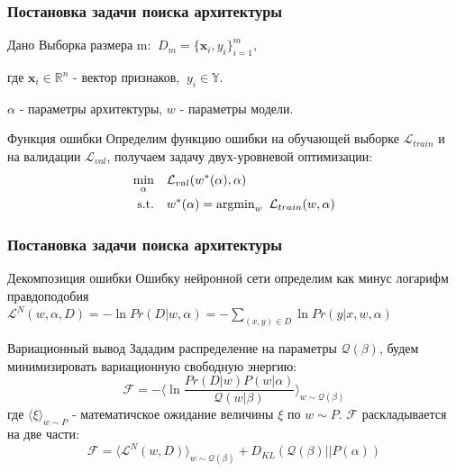 \documentclass{beamer}
\begin{document}
\begin{frame}
\frametitle{Постановка задачи поиска архитектуры}
\begin{block}{Дано}
Выборка размера m: $~ D_m = \{\textbf{x}_i, y_i\}_{i=1}^m,$

где $\textbf{x}_i \in \mathbb{R}^{n}$ - вектор признаков, $~y_i \in \mathbb{Y}$.

$\alpha$ - параметры архитектуры, $w$ - параметры модели.
\end{block}
\begin{block}{Функция ошибки}
Определим функцию ошибки на обучающей выборке $\mathcal{L}_{train}$ и на валидации $\mathcal{L}_{val}$, получаем задачу двух-уровневой оптимизации:
\begin{align}
	\min_\alpha \quad & \mathcal{L}_{val}(w^*(\alpha), \alpha) \label{eq:outer} \\
	\text{s.t.} \quad &w^*(\alpha) = \mathrm{argmin}_w \enskip \mathcal{L}_{train}(w, \alpha) \label{eq:inner}
\end{align}

\end{block}
\end{frame}

\begin{frame}
\frametitle{Постановка задачи поиска архитектуры}
\begin{block}{Декомпозиция ошибки}
Ошибку нейронной сети определим как минус логарифм правдоподобия $\mathcal{L}^N(w, \alpha, D) = -\ln Pr(D|w, \alpha) = -\sum \limits_{(x,y) \in D} \ln Pr(y|x, w, \alpha)$
\end{block}
\begin{block}{Вариационный вывод}
Зададим распределение на параметры $\mathcal{Q}(\beta)$, будем минимизировать вариационную свободную энергию: 
$$
\mathcal{F} = -\langle \ln \frac{Pr(D|w)P(w|\alpha)}{
\mathcal{Q}(w|\beta)} \rangle_{w \sim \mathcal{Q}(\beta)}
$$где $\langle \xi \rangle_{w \sim P}$ -  математичское ожидание величины $\xi$ по $w \sim P$. $\mathcal{F}$ раскладывается на две части:
$$
\mathcal{F} = \langle \mathcal{L}^N(w, D) \rangle_{w \sim \mathcal{Q}(\beta)}
+ D_{KL}(\mathcal{Q}(\beta)||P(\alpha))
$$
\end{block}
\end{frame}
\end{document}
